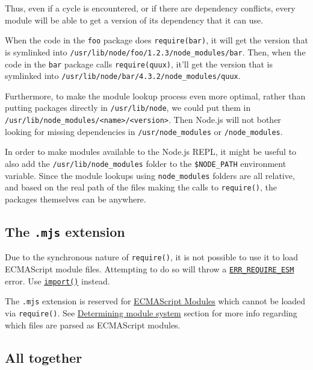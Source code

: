 Thus, even if a cycle is encountered, or if there are dependency
conflicts, every module will be able to get a version of its dependency
that it can use.

When the code in the \texttt{foo} package does
\texttt{require(\textquotesingle{}bar\textquotesingle{})}, it will get
the version that is symlinked into
\texttt{/usr/lib/node/foo/1.2.3/node\_modules/bar}. Then, when the code
in the \texttt{bar} package calls
\texttt{require(\textquotesingle{}quux\textquotesingle{})}, it'll get
the version that is symlinked into
\texttt{/usr/lib/node/bar/4.3.2/node\_modules/quux}.

Furthermore, to make the module lookup process even more optimal, rather
than putting packages directly in \texttt{/usr/lib/node}, we could put
them in
\texttt{/usr/lib/node\_modules/\textless{}name\textgreater{}/\textless{}version\textgreater{}}.
Then Node.js will not bother looking for missing dependencies in
\texttt{/usr/node\_modules} or \texttt{/node\_modules}.

In order to make modules available to the Node.js REPL, it might be
useful to also add the \texttt{/usr/lib/node\_modules} folder to the
\texttt{\$NODE\_PATH} environment variable. Since the module lookups
using \texttt{node\_modules} folders are all relative, and based on the
real path of the files making the calls to \texttt{require()}, the
packages themselves can be anywhere.

\subsection{\texorpdfstring{The \texttt{.mjs}
extension}{The .mjs extension}}\label{the-.mjs-extension}

Due to the synchronous nature of \texttt{require()}, it is not possible
to use it to load ECMAScript module files. Attempting to do so will
throw a \href{errors.md\#err_require_esm}{\texttt{ERR\_REQUIRE\_ESM}}
error. Use
\href{https://developer.mozilla.org/en-US/docs/Web/JavaScript/Reference/Operators/import}{\texttt{import()}}
instead.

The \texttt{.mjs} extension is reserved for \href{esm.md}{ECMAScript
Modules} which cannot be loaded via \texttt{require()}. See
\href{packages.md\#determining-module-system}{Determining module system}
section for more info regarding which files are parsed as ECMAScript
modules.

\subsection{All together}\label{all-together}

